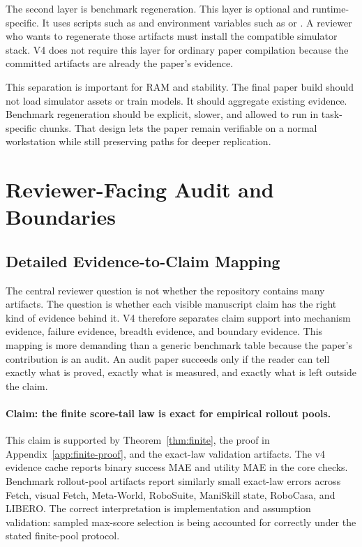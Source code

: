 The second layer is benchmark regeneration. This layer is optional and
runtime-specific. It uses scripts such as 
and environment variables such as  or
. A reviewer who wants to regenerate those artifacts must
install the compatible simulator stack. V4 does not require this layer for
ordinary paper compilation because the committed artifacts are already the
paper's evidence.

This separation is important for RAM and stability. The final paper build
should not load simulator assets or train models. It should aggregate existing
evidence. Benchmark regeneration should be explicit, slower, and allowed to
run in task-specific chunks. That design lets the paper remain verifiable on a
normal workstation while still preserving paths for deeper replication.

\section{Reviewer-Facing Audit and Boundaries}
\label{app:reviewer-facing-audit}

\subsection{Detailed Evidence-to-Claim Mapping}
\label{app:evidence-claim-map}

The central reviewer question is not whether the repository contains many
artifacts. The question is whether each visible manuscript claim has the right
kind of evidence behind it. V4 therefore separates claim support into
mechanism evidence, failure evidence, breadth evidence, and boundary evidence.
This mapping is more demanding than a generic benchmark table because the
paper's contribution is an audit. An audit paper succeeds only if the reader
can tell exactly what is proved, exactly what is measured, and exactly what is
left outside the claim.

\paragraph{Claim: the finite score-tail law is exact for empirical rollout
pools.}
This claim is supported by Theorem~\ref{thm:finite}, the proof in
Appendix~\ref{app:finite-proof}, and the exact-law validation artifacts. The
v4 evidence cache reports binary success MAE
\VFourWAMExactSuccessMAE{} and utility MAE \VFourWAMExactUtilityMAE{} in the
core checks. Benchmark rollout-pool artifacts report similarly small exact-law
errors across Fetch, visual Fetch, Meta-World, RoboSuite, ManiSkill state,
RoboCasa, and LIBERO. The correct interpretation is implementation and
assumption validation: sampled max-score selection is being accounted for
correctly under the stated finite-pool protocol.

